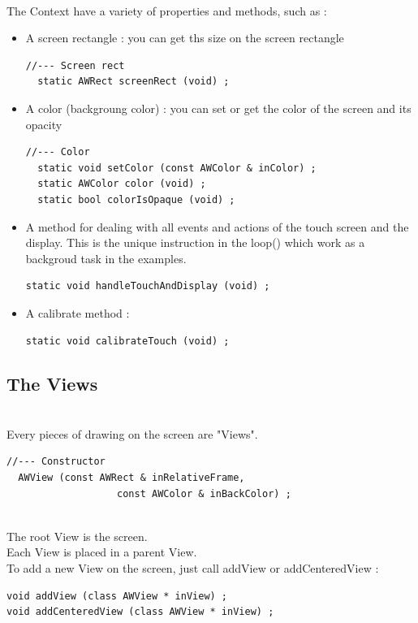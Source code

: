 \documentclass[a4paper,11pt]{extarticle}
\begin{document}
~\\ The Context have a variety of properties and methods, such as :

\begin{itemize}
\item A screen rectangle : you can get ths size on the screen rectangle
\begin{lstlisting}[language=Arduinonl]
//--- Screen rect
  static AWRect screenRect (void) ;
\end{lstlisting}

\item A color (backgroung color) : you can set or get the color of the screen and its opacity
\begin{lstlisting}[language=Arduinonl]
//--- Color
  static void setColor (const AWColor & inColor) ;
  static AWColor color (void) ;
  static bool colorIsOpaque (void) ;
\end{lstlisting}

\item A method for dealing with all events and actions of the touch screen and the display. This is the unique instruction in the loop() which work as a backgroud task in the examples.

\begin{lstlisting}[language=Arduinonl]
  static void handleTouchAndDisplay (void) ;
\end{lstlisting}

\item A calibrate method : 
\begin{lstlisting}[language=Arduinonl]
static void calibrateTouch (void) ;
\end{lstlisting}

\end{itemize}

\subsection{The Views}

~\\ Every pieces of drawing on the screen are "Views".

\begin{lstlisting}[language=Arduinonl]
//--- Constructor
  AWView (const AWRect & inRelativeFrame,
                   const AWColor & inBackColor) ;
 \end{lstlisting}

~\\ The root View is the screen.
~\\ Each View is placed in a parent View.
~\\ To add a new View on the screen, just call addView or addCenteredView :
\begin{lstlisting}[language=Arduinonl]
void addView (class AWView * inView) ;
void addCenteredView (class AWView * inView) ;
\end{lstlisting}
\end{document}
